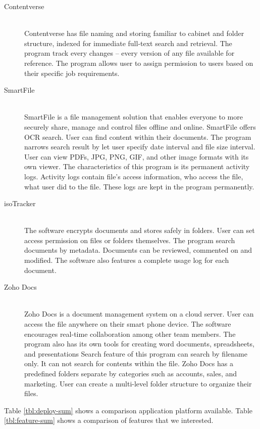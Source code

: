 \begin{description}
\item[Contentverse] \hfill \\
Contentverse has file naming and storing familiar to cabinet and folder structure, indexed for immediate full-text search and retrieval.
The program track every changes -- every version of any file available for reference.
The program allows user to assign permission to users based on their specific job requirements.

\item[SmartFile] \hfill \\
SmartFile is a file management solution that enables everyone to more securely share, manage and control files offline and online.
SmartFile offers \gls{OCR} search.
User can find content within their documents.
The program narrows search result by let user specify date interval and file size interval.
User can view PDFs, JPG, PNG, GIF, and other image formats with its own viewer.
The characteristics of this program is its permanent activity logs.
Activity logs contain file's access information, who access the file, what user did to the file.
These logs are kept in the program permanently.

\item[isoTracker] \hfill \\
The software encrypts documents and stores safely in folders.
User can set access permission on files or folders themselves.
The program search documents by metadata.
Documents can be reviewed, commented on and modified. The software also features a complete usage log for each document.

\item[Zoho Docs] \hfill \\
Zoho Docs is a document management system on a cloud server.
User can access the file anywhere on their smart phone device.
The software encourages real-time collaboration among other team members.
The program also has its own tools for creating word documents, spreadsheets, and presentations
Search feature of this program can search by filename only.
It can not search for contents within the file.
Zoho Docs has a predefined folders separate by categories such as accounts, sales, and marketing.
User can create a multi-level folder structure to organize their files.
\end{description}

Table \ref{tbl:deploy-sum} shows a comparison application platform available.
Table \ref{tbl:feature-sum} shows a comparison of features that we interested.

